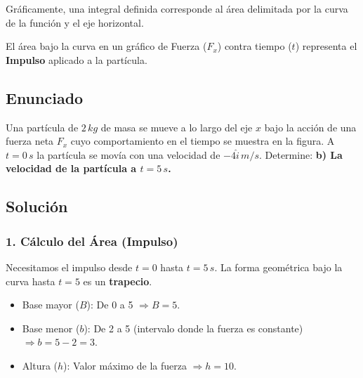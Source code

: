 \documentclass[12pt, a4paper]{article}
\begin{document}
Gráficamente, una integral definida corresponde al área delimitada por la curva de la función y el eje horizontal.

\begin{tcolorbox}[colback=green!5!white, colframe=green!50!black, title=Respuesta Final]
El área bajo la curva en un gráfico de Fuerza ($F_x$) contra tiempo ($t$) representa el \textbf{Impulso} aplicado a la partícula.
\end{tcolorbox}

\newpage

\subsection*{Enunciado}
Una partícula de $2 \, \si{kg}$ de masa se mueve a lo largo del eje $x$ bajo la acción de una fuerza neta $F_x$ cuyo comportamiento en el tiempo se muestra en la figura. A $t=0 \, \si{s}$ la partícula se movía con una velocidad de $-4 \hat{i} \, \si{m/s}$. 
Determine: \textbf{b) La velocidad de la partícula a $t=5 \, \si{s}$.}

\begin{center}
\end{center}

\subsection*{Solución}

\subsubsection*{1. Cálculo del Área (Impulso)}
Necesitamos el impulso desde $t=0$ hasta $t=5 \, \si{s}$.
La forma geométrica bajo la curva hasta $t=5$ es un \textbf{trapecio}.
\begin{itemize}
    \item Base mayor ($B$): De 0 a 5 $\Rightarrow B = 5$.
    \item Base menor ($b$): De 2 a 5 (intervalo donde la fuerza es constante) $\Rightarrow b = 5 - 2 = 3$.
    \item Altura ($h$): Valor máximo de la fuerza $\Rightarrow h = 10$.
\end{itemize}
\end{document}
